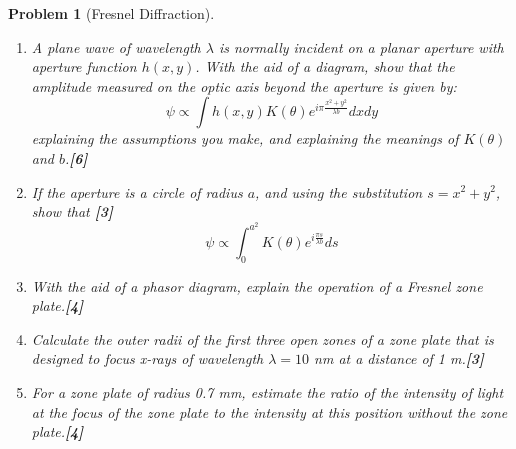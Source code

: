 \documentclass[a4paper]{article}
\theoremstyle{new}
\newtheorem{qns}{Problem}[subsection]
\begin{document}
\newpage
\begin{qns}[Fresnel Diffraction]\leavevmode
\begin{enumerate}[label=(\roman*)]
\item A plane wave of wavelength $\lambda$ is normally incident on a planar aperture with aperture function $h(x, y)$. With the aid of a diagram, show that the amplitude measured on the optic axis beyond the aperture is given by: 
$$\psi\propto\int h(x,y)K(\theta)e^{i\pi\frac{x^2+y^2}{\lambda b}}dxdy$$
explaining the assumptions you make, and explaining the meanings of $K(\theta)$ and $b$.\hfill\textbf{[6]}
\item If the aperture is a circle of radius $a$, and using the substitution $s = x^2 + y^2$, show that \hfill\textbf{[3]}
$$\psi\propto\int_0^{a^2}K(\theta)e^{i\frac{\pi s}{\lambda b}}ds$$
\item With the aid of a phasor diagram, explain the operation of a Fresnel zone plate.\hfill\textbf{[4]}
\item Calculate the outer radii of the first three open zones of a zone plate that is designed to focus x-rays of wavelength $\lambda=10$ nm at a distance of 1 m.\hfill\textbf{[3]}
\item For a zone plate of radius 0.7 mm, estimate the ratio of the intensity of light at the focus of the zone plate to the intensity at this position without the zone plate.\hfill\textbf{[4]}
\end{enumerate}
\end{qns}
\end{document}
